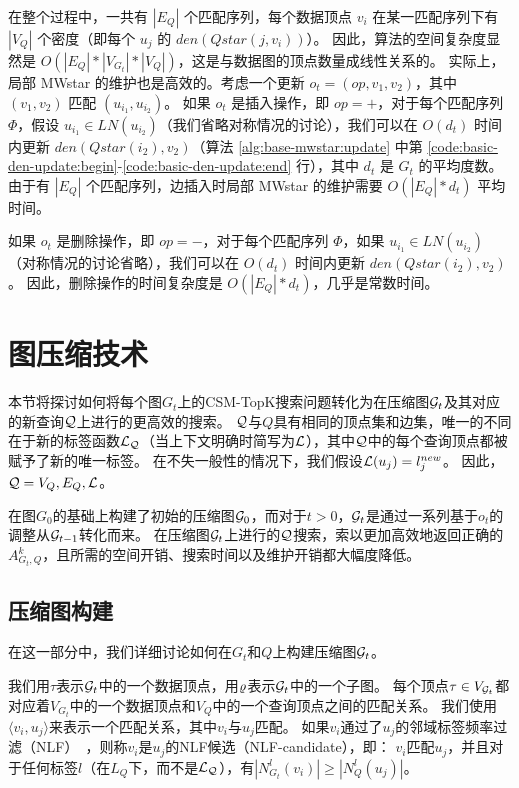 在整个过程中，一共有 $|E_Q|$ 个匹配序列，每个数据顶点 $v_i$ 在某一匹配序列下有 $|V_Q|$ 个密度（即每个 $u_j$ 的 $den(Qstar(j, v_i))$）。
因此，算法的空间复杂度显然是 $O(|E_Q|*|V_{G_t}|*|V_Q|)$，这是与数据图的顶点数量成线性关系的。
实际上，局部 MWstar 的维护也是高效的。考虑一个更新 $o_t = (op, v_1, v_2)$，其中 $(v_1, v_2)$ 匹配 $(u_{i_1}, u_{i_2})$。
如果 $o_t$ 是插入操作，即 $op = +$，对于每个匹配序列 $\Phi$，假设 $u_{i_1} \in LN(u_{i_2})$（我们省略对称情况的讨论），我们可以在 $O(d_t)$ 时间内更新 $den(Qstar(i_2), v_2)$（算法 \ref{alg:base-mwstar:update} 中第 \ref{code:basic-den-update:begin}-\ref{code:basic-den-update:end} 行），其中 $d_t$ 是 $G_t$ 的平均度数。
由于有 $|E_Q|$ 个匹配序列，边插入时局部 MWstar 的维护需要 $O(|E_Q| * d_t)$ 平均时间。

如果 $o_t$ 是删除操作，即 $op = -$，对于每个匹配序列 $\Phi$，如果 $u_{i_1} \in LN(u_{i_2})$（对称情况的讨论省略），我们可以在 $O(d_t)$ 时间内更新 $den(Qstar(i_2), v_2)$。
因此，删除操作的时间复杂度是 $O(|E_Q| * d_t)$，几乎是常数时间。

\section{图压缩技术}
\label{mwstar:compact-graph}

本节将探讨如何将每个图$G_t$上的CSM-TopK搜索问题转化为在压缩图$\mathcal{G}_t$及其对应的新查询$\mathcal{Q}$上进行的更高效的搜索。
$\mathcal{Q}$与$Q$具有相同的顶点集和边集，唯一的不同在于新的标签函数$\mathcal{L}_{\mathcal{Q}}$（当上下文明确时简写为$\mathcal{L}$），其中$\mathcal{Q}$中的每个查询顶点都被赋予了新的唯一标签。
在不失一般性的情况下，我们假设$\mathcal{L}(u_j) = l_j^{new}$。
因此，$\mathcal{Q} = {V_Q, E_Q, \mathcal{L}}$。


在图$G_0$的基础上构建了初始的压缩图$\mathcal{G}_0$，而对于$t>0$，$\mathcal{G}_t$是通过一系列基于$o_t$的调整从$\mathcal{G}_{t-1}$转化而来。
在压缩图$\mathcal{G}_t$上进行的$\mathcal{Q}$搜索，索以更加高效地返回正确的$A_{G_t, Q}^k$，且所需的空间开销、搜索时间以及维护开销都大幅度降低。

\subsection{压缩图构建}
\label{s-sec:compact-graph-construction}

在这一部分中，我们详细讨论如何在$G_t$和$Q$上构建压缩图$\mathcal{G}_t$。

我们用$\tau$表示$\mathcal{G}_t$中的一个数据顶点，用$\varrho$表示$\mathcal{G}_t$中的一个子图。
每个顶点$\tau \in V_{\mathcal{G}_t}$都对应着$V_{G_t}$中的一个数据顶点和$V_Q$中的一个查询顶点之间的匹配关系。
我们使用$\langle v_i, u_j \rangle$来表示一个匹配关系，其中$v_i$与$u_j$匹配。
如果$v_i$通过了$u_j$的邻域标签频率过滤（NLF）~\cite{sgi-turbo-iso-DBLP:conf/sigmod/HanLL13}，则称$v_i$是$u_j$的NLF候选（NLF-candidate），即：
$v_i$匹配$u_j$，并且对于任何标签$l$（在$L_Q$下，而不是$\mathcal{L}_{\mathcal{Q}}$），有$|N_{G_t}^l(v_i)| \geq |N_Q^l(u_j)|$。

